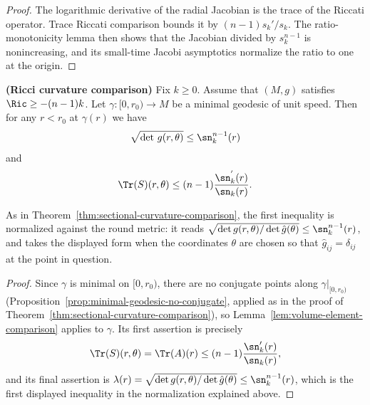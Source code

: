 \begin{proof}
\sketch
{}
\leanok
The logarithmic derivative of the radial Jacobian is the trace of the Riccati operator. Trace Riccati comparison bounds it by $(n-1)s_k'/s_k$. The ratio-monotonicity lemma then shows that the Jacobian divided by $s_k^{n-1}$ is nonincreasing, and its small-time Jacobi asymptotics normalize the ratio to one at the origin.
\end{proof}

\begin{theorem}
\label{thm:ricci-curvature-comparison}
\label{riccurvcomp}



{\bf (Ricci curvature comparison)} Fix $k\ge 0$. Assume that $(M,
g)$ satisfies $\Ric \geq -(n-1)k$. Let $\gamma\colon [0,r_0)\to
M$ be a minimal geodesic of unit speed. Then for any $r<r_0$ at
$\gamma(r)$ we have
$$\sqrt{\det\, g(r,\theta)} \leq \sn^{n-1}_{k}(r)$$ and
$$\Tr(S)(r,\theta) \leq (n-1)\frac{\sn_{k}^{'}(r)}{\sn_{k}(r)}.$$
\end{theorem}

As in Theorem~\ref{thm:sectional-curvature-comparison}, the first
inequality is normalized against the round metric: it reads
$\sqrt{\det g(r,\theta)/\det\hat g(\theta)}\le\sn_k^{n-1}(r)$, and
takes the displayed form when the coordinates $\theta$ are chosen
so that $\hat g_{ij}=\delta_{ij}$ at the point in question.

\begin{proof}
\sketch
{}
Since $\gamma$ is minimal on $[0,r_0)$, there are no conjugate
points along $\gamma|_{[0,r_0)}$
(Proposition~\ref{prop:minimal-geodesic-no-conjugate}, applied as in
the proof of Theorem~\ref{thm:sectional-curvature-comparison}), so
Lemma~\ref{lem:volume-element-comparison} applies to $\gamma$. Its
first assertion is precisely
$$\Tr(S)(r,\theta)=\Tr(A)(r)\le(n-1)\frac{\sn_k'(r)}{\sn_k(r)},$$
and its final assertion is
$\lambda(r)=\sqrt{\det g(r,\theta)/\det\hat g(\theta)}
\le\sn_k^{n-1}(r)$, which is the first displayed inequality in the
normalization explained above.
\end{proof}

